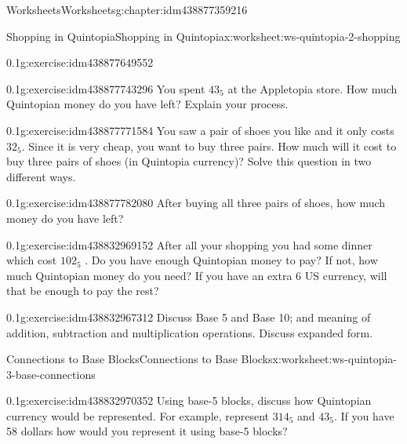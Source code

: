 \documentclass[twoside,11pt,]{book}
\begin{document}
\begin{chapterptx}{Worksheets}{}{Worksheets}{}{}{g:chapter:idm438877359216}
\begin{worksheet-section-numberless}{Shopping in Quintopia}{}{Shopping in Quintopia}{}{}{x:worksheet:ws-quintopia-2-shopping}
\begin{divisionexercise}{1}{}{0.1}{g:exercise:idm438877649552}
\end{divisionexercise}%
\begin{divisionexercise}{2}{}{0.1}{g:exercise:idm438877743296}%
You spent \(43_{5}\) at the Appletopia store. How much Quintopian money do you have left?  Explain your process.%
\end{divisionexercise}%
\begin{divisionexercise}{3}{}{0.1}{g:exercise:idm438877771584}%
You saw a pair of shoes you like and it only costs \(32_{5}\). Since it is very cheap, you want to buy three pairs. How much will it cost to buy three pairs of shoes (in Quintopia currency)? Solve this question in two different ways.%
\end{divisionexercise}%
\clearpage
\begin{divisionexercise}{4}{}{0.1}{g:exercise:idm438877782080}%
After buying all three pairs of shoes, how much money do you have left?%
\end{divisionexercise}%
\begin{divisionexercise}{5}{}{0.1}{g:exercise:idm438832969152}%
After all your shopping you had some dinner which cost \(102_{5}\) . Do you have enough Quintopian money to pay? If not, how much Quintopian money do you need?  If you have an extra \textdollar{}6 US currency, will that be enough to pay the rest?%
\end{divisionexercise}%
\begin{divisionexercise}{6}{}{0.1}{g:exercise:idm438832967312}%
Discuss Base 5 and Base 10; and meaning of addition, subtraction and multiplication operations. Discuss expanded form.%
\end{divisionexercise}%
\end{worksheet-section-numberless}
\restoregeometry
%
%
\typeout{************************************************}
\typeout{************************************************}
%
\begin{worksheet-section-numberless}{Connections to Base Blocks}{}{Connections to Base Blocks}{}{}{x:worksheet:ws-quintopia-3-base-connections}
\begin{divisionexercise}{1}{}{0.1}{g:exercise:idm438832970352}%
Using base-5 blocks, discuss how Quintopian currency would be represented. For example, represent \(314_{5}\) and \(43_{5}\). If you have \textdollar{}58 dollars how would you represent it using base-5 blocks?%
\end{divisionexercise}%

\end{worksheet-section-numberless}
\end{chapterptx}
\end{document}

